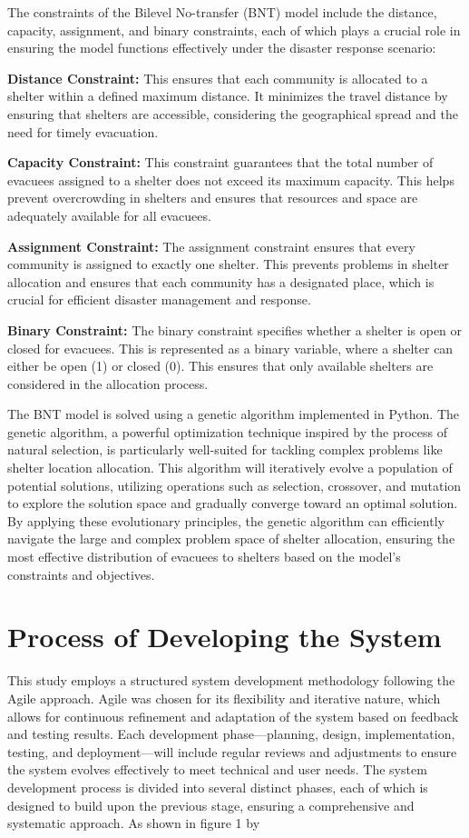 	The constraints of the Bilevel No-transfer (BNT) model include the distance, capacity, assignment, and binary constraints, each of which plays a crucial role in ensuring the model functions effectively under the disaster response scenario:
	
	\textbf{Distance Constraint:} This ensures that each community is allocated to a shelter within a defined maximum distance. It minimizes the travel distance by ensuring that shelters are accessible, considering the geographical spread and the need for timely evacuation.
	
	\textbf{Capacity Constraint: }This constraint guarantees that the total number of evacuees assigned to a shelter does not exceed its maximum capacity. This helps prevent overcrowding in shelters and ensures that resources and space are adequately available for all evacuees.
	
	\textbf{Assignment Constraint: }The assignment constraint ensures that every community is assigned to exactly one shelter. This prevents problems in shelter allocation and ensures that each community has a designated place, which is crucial for efficient disaster management and response.
	
	\textbf{Binary Constraint: } The binary constraint specifies whether a shelter is open or closed for evacuees. This is represented as a binary variable, where a shelter can either be open (1) or closed (0). This ensures that only available shelters are considered in the allocation process.
	
	The BNT model is solved using a genetic algorithm implemented in Python. The genetic algorithm, a powerful optimization technique inspired by the process of natural selection, is particularly well-suited for tackling complex problems like shelter location allocation. This algorithm will iteratively evolve a population of potential solutions, utilizing operations such as selection, crossover, and mutation to explore the solution space and gradually converge toward an optimal solution. By applying these evolutionary principles, the genetic algorithm can efficiently navigate the large and complex problem space of shelter allocation, ensuring the most effective distribution of evacuees to shelters based on the model’s constraints and objectives.

\section{Process of Developing the System}
This study employs a structured system development methodology following the Agile approach. Agile was chosen for its flexibility and iterative nature, which allows for continuous refinement and adaptation of the system based on feedback and testing results. Each development phase—planning, design, implementation, testing, and deployment—will include regular reviews and adjustments to ensure the system evolves effectively to meet technical and user needs.
The system development process is divided into several distinct phases, each of which is designed to build upon the previous stage, ensuring a comprehensive and systematic approach. As shown in figure 1 by 

